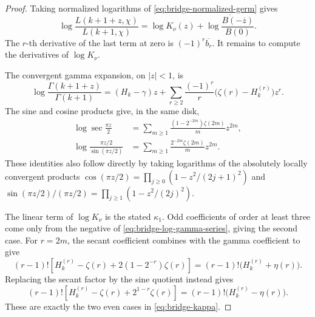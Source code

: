 \begin{proof}
Taking normalized logarithms of
\eqref{eq:bridge-normalized-germ} gives
\[
 \log\frac{L(k+1+z,\chi)}{L(k+1,\chi)}
 =\log K_\nu(z)
  +\overline{\log\frac{B(-\overline z)}{B(0)}}.
\]
The \(r\)-th derivative of the last term at zero is
\((-1)^r\overline{b_r}\). It remains to compute the
derivatives of \(\log K_\nu\).

The convergent gamma expansion, on \(|z|<1\), is
\begin{equation}
 \log\frac{\Gamma(k+1+z)}{\Gamma(k+1)}
 =(H_k-\gamma)z+
 \sum_{r\geq2}\frac{(-1)^r}{r}
       \bigl(\zeta(r)-H_k^{(r)}\bigr)z^r.
 \label{eq:bridge-log-gamma-series}
\end{equation}
The sine and cosine products give, in the same disk,
\begin{align}
 \log\sec\frac{\pi z}{2}
 &=\sum_{m\geq1}
   \frac{(1-2^{-2m})\zeta(2m)}{m}z^{2m},
 \label{eq:bridge-log-sec-series}\\
 \log\frac{\pi z/2}{\sin(\pi z/2)}
 &=\sum_{m\geq1}
   \frac{2^{-2m}\zeta(2m)}{m}z^{2m}.
 \label{eq:bridge-log-sinc-series}
\end{align}
These identities also follow directly by taking logarithms
of the absolutely locally convergent products
\(\cos(\pi z/2)=\prod_{j\geq0}(1-z^2/(2j+1)^2)\) and
\(\sin(\pi z/2)/(\pi z/2)
=\prod_{j\geq1}(1-z^2/(2j)^2)\).

The linear term of \(\log K_\nu\) is the stated
\(\kappa_1\). Odd coefficients of order at least three come
only from the negative of
\eqref{eq:bridge-log-gamma-series}, giving the second case.
For \(r=2m\), the secant coefficient combines with the gamma
coefficient to give
\[
 (r-1)!\left[
  H_k^{(r)}-\zeta(r)+2(1-2^{-r})\zeta(r)\right]
 =(r-1)!\bigl(H_k^{(r)}+\eta(r)\bigr).
\]
Replacing the secant factor by the sine quotient instead gives
\[
 (r-1)!\left[
  H_k^{(r)}-\zeta(r)+2^{1-r}\zeta(r)\right]
 =(r-1)!\bigl(H_k^{(r)}-\eta(r)\bigr).
\]
These are exactly the two even cases in
\eqref{eq:bridge-kappa}.
\end{proof}


